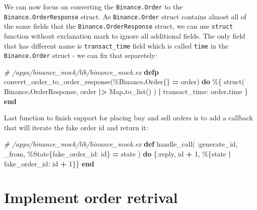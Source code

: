 \documentclass[
  oneside]{book}
\newenvironment{Shaded}{\begin{snugshade}}{\end{snugshade}}
\newcommand{\CommentTok}[1]{\textcolor[rgb]{0.56,0.35,0.01}{\textit{#1}}}
\newcommand{\ConstantTok}[1]{\textcolor[rgb]{0.00,0.00,0.00}{#1}}
\newcommand{\DecValTok}[1]{\textcolor[rgb]{0.00,0.00,0.81}{#1}}
\newcommand{\KeywordTok}[1]{\textcolor[rgb]{0.13,0.29,0.53}{\textbf{#1}}}
\newcommand{\NormalTok}[1]{#1}
\newcommand{\OperatorTok}[1]{\textcolor[rgb]{0.81,0.36,0.00}{\textbf{#1}}}
\newcommand{\VariableTok}[1]{\textcolor[rgb]{0.00,0.00,0.00}{#1}}
\begin{document}
We can now focus on converting the \texttt{Binance.Order} to the \texttt{Binance.OrderResponse} struct. As \texttt{Binance.Order} struct contains almost all of the same fields that the \texttt{Binance.OrderResponse} struct, we can use \texttt{struct} function without exclanation mark to ignore all additional fields. The only field that has different name is \texttt{transact\_time} field which is called \texttt{time} in the \texttt{Binance.Order} struct - we can fix that separetely:

\begin{Shaded}
\begin{Highlighting}[]
\CommentTok{\# /apps/binance\_mock/lib/binance\_mock.ex}
  \KeywordTok{defp}\NormalTok{ convert\_order\_to\_order\_response(\%}\ConstantTok{Binance}\OperatorTok{.}\ConstantTok{Order}\NormalTok{\{\} }\OperatorTok{=}\NormalTok{ order) }\KeywordTok{do}
\NormalTok{    \%\{}
\NormalTok{      struct(}
        \ConstantTok{Binance}\OperatorTok{.}\ConstantTok{OrderResponse}\NormalTok{,}
\NormalTok{        order }\OperatorTok{|\textgreater{}} \ConstantTok{Map}\OperatorTok{.}\NormalTok{to\_list()}
\NormalTok{      )}
      \OperatorTok{|} \VariableTok{transact\_time:}\NormalTok{ order}\OperatorTok{.}\NormalTok{time}
\NormalTok{    \}}
  \KeywordTok{end}
\end{Highlighting}
\end{Shaded}

Last function to finish support for placing buy and sell orders is to add a callback that will iterate the fake order id and return it:

\begin{Shaded}
\begin{Highlighting}[]
\CommentTok{\# /apps/binance\_mock/lib/binance\_mock.ex}
  \KeywordTok{def}\NormalTok{ handle\_call(}
        \VariableTok{:generate\_id}\NormalTok{,}
\NormalTok{        \_from,}
\NormalTok{        \%}\ConstantTok{State}\NormalTok{\{}\VariableTok{fake\_order\_id:}\NormalTok{ id\} }\OperatorTok{=}\NormalTok{ state}
\NormalTok{      ) }\KeywordTok{do}
\NormalTok{    \{}\VariableTok{:reply}\NormalTok{, id }\OperatorTok{+} \DecValTok{1}\NormalTok{, \%\{state }\OperatorTok{|} \VariableTok{fake\_order\_id:}\NormalTok{ id }\OperatorTok{+} \DecValTok{1}\NormalTok{\}\}}
  \KeywordTok{end}
\end{Highlighting}
\end{Shaded}

\hypertarget{implement-order-retrival}{%
\section{Implement order retrival}\label{implement-order-retrival}}
\end{document}
